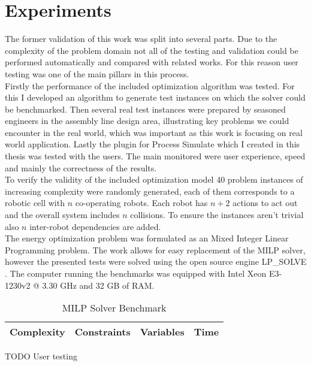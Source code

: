 \chapter{Experiments}
\label{ch:experiments}
\graphicspath{{chapters/Experiments/}}

The former validation of this work was split into several parts. Due to the complexity of the problem domain not all of the testing and validation could be performed automatically and compared with related works. For this reason user testing was one of the main pillars in this process. \\

Firstly the performance of the included optimization algorithm was tested. For this I developed an algorithm to generate test instances on which the solver could be benchmarked. Then several real test instances were prepared by seasoned engineers in the assembly line design area, illustrating key problems we could encounter in the real world, which was important as this work is focusing on real world application. Lastly the plugin for Process Simulate which I created in this thesis was tested with the users. The main monitored were user experience, speed and mainly the correctness of the results. \\

To verify the validity of the included optimization model 40 problem instances of increasing complexity were randomly generated, each of them corresponds to a robotic cell with $n$ co-operating robots. Each robot has $n + 2$ actions to act out and the overall system includes $n$ collisions. To ensure the instances aren't trivial also $n$ inter-robot dependencies are added. \\

The energy optimization problem was formulated as an Mixed Integer Linear Programming problem. The work allows for easy replacement of the MILP solver, however the presented tests were solved using the open source engine LP\_SOLVE \cite{LPSolve}. The computer running the benchmarks was equipped with Intel Xeon E3-1230v2 @ 3.30 GHz \cite{BeastCPUIntelARK} and 32 GB of RAM. \\

\begin{table}[ht]
    \label{tbl:milpspeed}
    \centering
    \begin{tabular}{|c|c|c|c|}
        \hline
        Complexity & Constraints & Variables & Time \\
        \hline
        
        \hline
    \end{tabular}
    \caption{MILP Solver Benchmark}
\end{table}

TODO User testing \\